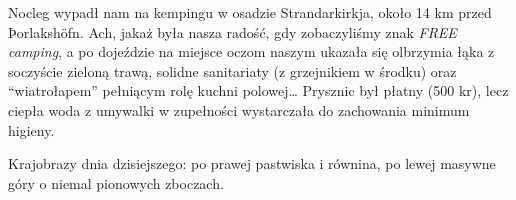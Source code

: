 
Nocleg wypadł nam na kempingu w osadzie Strandarkirkja, około 14 km przed Þorlakshöfn. Ach, jakaż była nasza radość, gdy zobaczyliśmy znak \emph{FREE camping}, a po dojeździe na miejsce oczom naszym ukazała się olbrzymia łąka z soczyście zieloną trawą, solidne sanitariaty (z grzejnikiem w środku) oraz “wiatrołapem” pełniącym rolę kuchni polowej… Prysznic był płatny (500 kr), lecz ciepła woda z umywalki w zupełności wystarczała do zachowania minimum higieny.

Krajobrazy dnia dzisiejszego: po prawej pastwiska i równina, po lewej masywne góry o niemal pionowych zboczach.

